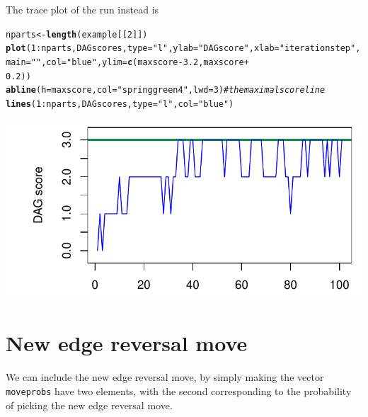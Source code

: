 \documentclass[a4paper]{article}\usepackage[]{graphicx}\usepackage[]{color}
\makeatletter
\def\maxwidth{ %
  \ifdim\Gin@nat@width>\linewidth
    \linewidth
  \else
    \Gin@nat@width
  \fi
}
\newcommand{\hlnum}[1]{\textcolor[rgb]{0.686,0.059,0.569}{#1}}%
\newcommand{\hlstr}[1]{\textcolor[rgb]{0.192,0.494,0.8}{#1}}%
\newcommand{\hlcom}[1]{\textcolor[rgb]{0.678,0.584,0.686}{\textit{#1}}}%
\newcommand{\hlopt}[1]{\textcolor[rgb]{0,0,0}{#1}}%
\newcommand{\hlstd}[1]{\textcolor[rgb]{0.345,0.345,0.345}{#1}}%
\newcommand{\hlkwb}[1]{\textcolor[rgb]{0.69,0.353,0.396}{#1}}%
\newcommand{\hlkwc}[1]{\textcolor[rgb]{0.333,0.667,0.333}{#1}}%
\newcommand{\hlkwd}[1]{\textcolor[rgb]{0.737,0.353,0.396}{\textbf{#1}}}%
\newenvironment{kframe}{%
 \def\at@end@of@kframe{}%
 \ifinner\ifhmode%
  \def\at@end@of@kframe{\end{minipage}}%
  \begin{minipage}{\columnwidth}%
 \fi\fi%
 \def\FrameCommand##1{\hskip\@totalleftmargin \hskip-\fboxsep
 \colorbox{shadecolor}{##1}\hskip-\fboxsep
     \hskip-\linewidth \hskip-\@totalleftmargin \hskip\columnwidth}%
 \MakeFramed {\advance\hsize-\width
   \@totalleftmargin\z@ \linewidth\hsize
   \@setminipage}}%
 {\par\unskip\endMakeFramed%
 \at@end@of@kframe}
\newenvironment{knitrout}{}{} %
\newcommand{\nn}{\noindent}
\makeatother
\begin{document}
\nn The trace plot of the run instead is

\begin{knitrout}
\color{fgcolor}\begin{kframe}
\begin{alltt}
\hlstd{nparts} \hlkwb{<-} \hlkwd{length}\hlstd{(example[[}\hlnum{2}\hlstd{]])}
\hlkwd{plot}\hlstd{(}\hlnum{1}\hlopt{:}\hlstd{nparts, DAGscores,} \hlkwc{type} \hlstd{=} \hlstr{"l"}\hlstd{,} \hlkwc{ylab} \hlstd{=} \hlstr{"DAG score"}\hlstd{,} \hlkwc{xlab} \hlstd{=} \hlstr{"iteration step"}\hlstd{,}
    \hlkwc{main} \hlstd{=} \hlstr{""}\hlstd{,} \hlkwc{col} \hlstd{=} \hlstr{"blue"}\hlstd{,} \hlkwc{ylim} \hlstd{=} \hlkwd{c}\hlstd{(maxscore} \hlopt{-} \hlnum{3.2}\hlstd{, maxscore} \hlopt{+}
        \hlnum{0.2}\hlstd{))}
\hlkwd{abline}\hlstd{(}\hlkwc{h} \hlstd{= maxscore,} \hlkwc{col} \hlstd{=} \hlstr{"springgreen4"}\hlstd{,} \hlkwc{lwd} \hlstd{=} \hlnum{3}\hlstd{)}  \hlcom{# the maximal score line}
\hlkwd{lines}\hlstd{(}\hlnum{1}\hlopt{:}\hlstd{nparts, DAGscores,} \hlkwc{type} \hlstd{=} \hlstr{"l"}\hlstd{,} \hlkwc{col} \hlstd{=} \hlstr{"blue"}\hlstd{)}
\end{alltt}
\end{kframe}

{\centering \includegraphics[width=\maxwidth]{figure/minimal-unnamed-chunk-11-1} 

}



\end{knitrout}

\section{New edge reversal move}

We can include the new edge reversal move, by simply making the vector \texttt{moveprobs} have two elements, with the second corresponding to the probability of picking the new edge reversal move.
\end{document}
